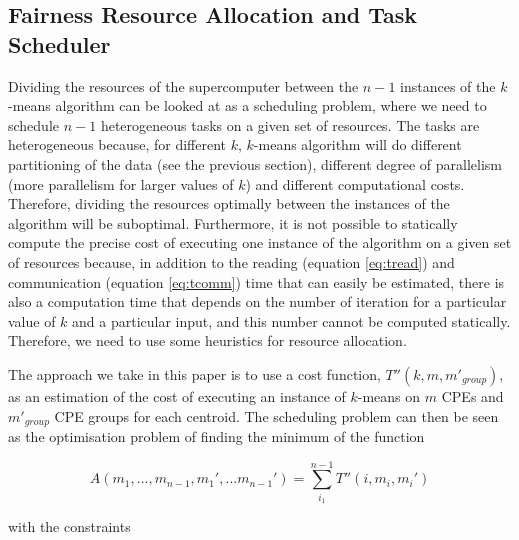 \documentclass[10pt,journal,compsoc]{IEEEtran}
\begin{document}
\subsection{Fairness Resource Allocation and Task Scheduler}
Dividing the resources of the supercomputer between the $n-1$
instances of the $k$-means algorithm can be looked at as a scheduling
problem, where we need to schedule $n-1$ heterogeneous tasks on a
given set of resources. The tasks are heterogeneous because, for
different $k$, $k$-means algorithm will do different partitioning of
the data (see the previous section), different degree of parallelism
(more parallelism for larger values of $k$) and different
computational costs. Therefore, dividing the resources optimally
between the instances of the algorithm will be suboptimal.
Furthermore, it is not possible to statically
compute the precise cost of executing one instance of the algorithm on
a given set of resources because, in addition to the reading (equation
\ref{eq:tread}) and communication (equation \ref{eq:tcomm}) time that
can easily be estimated, there is also a computation time that depends
on the number of iteration for a particular value of $k$ and a
particular input, and this number cannot be computed
statically. Therefore, we need to use some heuristics for resource
allocation.

The approach we take in this paper is to use a cost function,
$T''(k,m,m'_{group})$, as an estimation of the cost of executing an
instance of $k$-means on $m$ CPEs and $m'_{group}$ CPE groups for each
centroid. The scheduling problem can then be seen as the optimisation
problem of finding the minimum of the function

$$A(m_1,\dots,m_{n-1}, m_1', \dots
m_{n-1}') = \sum_{i_1}^{n-1} T''(i,m_i,m_i')$$

with the constraints
\end{document}
